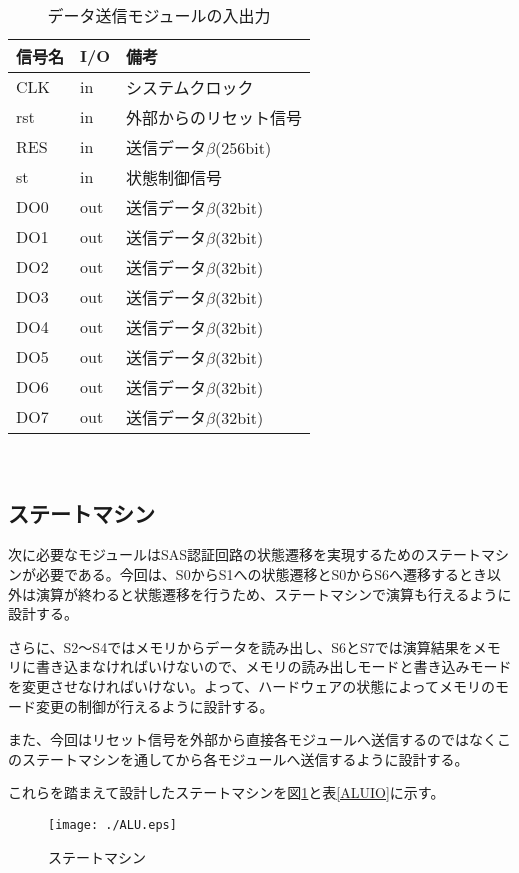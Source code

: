 \documentclass{thesis}
\begin{document}
\begin{table}[htb]
　\begin{center}
\caption{データ送信モジュールの入出力}
\label{data_outIO}
  \begin{tabular}{|p{2cm}|p{1cm}|p{4cm}|} \hline
  信号名 & I/O & 備考 \\ \hline \hline
   CLK   &  in   & システムクロック  \\ \hline
   rst   &  in   &  外部からのリセット信号  \\ \hline
   RES   &  in   &  送信データ$\beta$(256bit)  \\ \hline
   st      &  in    &  状態制御信号  \\ \hline
   DO0   &  out  &  送信データ$\beta$(32bit)  \\ \hline
   DO1   &  out  &  送信データ$\beta$(32bit)  \\ \hline
   DO2   &  out  &  送信データ$\beta$(32bit)  \\ \hline
   DO3  &  out  &  送信データ$\beta$(32bit)  \\ \hline
   DO4   &  out  &  送信データ$\beta$(32bit)  \\ \hline
   DO5   &  out  &  送信データ$\beta$(32bit)  \\ \hline
   DO6   &  out  &  送信データ$\beta$(32bit)  \\ \hline
   DO7   &  out  &  送信データ$\beta$(32bit)  \\ \hline
  \end{tabular}
  \end{center}
\end{table}　\\

\subsection{ステートマシン}
次に必要なモジュールはSAS認証回路の状態遷移を実現するためのステートマシンが必要である。今回は、S0からS1への状態遷移とS0からS6へ遷移するとき以外は演算が終わると状態遷移を行うため、ステートマシンで演算も行えるように設計する。\par
さらに、S2～S4ではメモリからデータを読み出し、S6とS7では演算結果をメモリに書き込まなければいけないので、メモリの読み出しモードと書き込みモードを変更させなければいけない。よって、ハードウェアの状態によってメモリのモード変更の制御が行えるように設計する。\par
また、今回はリセット信号を外部から直接各モジュールへ送信するのではなくこのステートマシンを通してから各モジュールへ送信するように設計する。\par
これらを踏まえて設計したステートマシンを図\ref{ALU}と表\ref{ALUIO}に示す。
\begin{figure}[H]
 \center
 \texttt{[image: ./ALU.eps]}
 \caption{ステートマシン}
 \label{ALU}
\end{figure}
\end{document}
